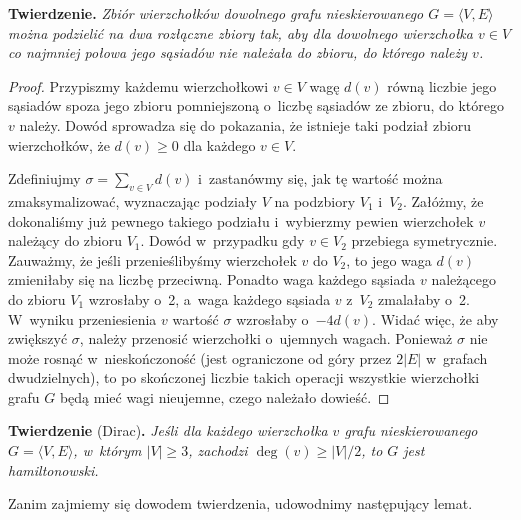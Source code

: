 \subproblem %
\textsf{\textbf{Twierdzenie.}} \textit{Zbiór wierzchołków dowolnego grafu nieskierowanego\/ $G=\langle V,E\rangle$ można podzielić na dwa rozłączne zbiory tak, aby dla dowolnego wierzchołka\/ $v\in V$ co najmniej połowa jego sąsiadów nie należała do zbioru, do którego należy\/ $v$.}
\begin{proof}
Przypiszmy każdemu wierzchołkowi $v\in V$ wagę $d(v)$ równą liczbie jego sąsiadów spoza jego zbioru pomniejszoną o~liczbę sąsiadów ze zbioru, do którego $v$ należy. Dowód sprowadza się do pokazania, że istnieje taki podział zbioru wierzchołków, że $d(v)\ge0$ dla każdego $v\in V$\!.

Zdefiniujmy $\sigma=\sum_{v\in V}d(v)$ i~zastanówmy się, jak tę wartość można zmaksymalizować, wyznaczając podziały $V$ na podzbiory $V_1$ i~$V_2$. Załóżmy, że dokonaliśmy już pewnego takiego podziału i~wybierzmy pewien wierzchołek $v$ należący do zbioru $V_1$. Dowód w~przypadku gdy $v\in V_2$ przebiega symetrycznie. Zauważmy, że jeśli przenieślibyśmy wierzchołek $v$ do $V_2$, to jego waga $d(v)$ zmieniłaby się na liczbę przeciwną. Ponadto waga każdego sąsiada $v$ należącego do zbioru $V_1$ wzrosłaby o~2, a~waga każdego sąsiada $v$ z~$V_2$ zmalałaby o~2. W~wyniku przeniesienia $v$ wartość $\sigma$ wzrosłaby o~$-4d(v)$. Widać więc, że aby zwiększyć $\sigma$, należy przenosić wierzchołki o~ujemnych wagach. Ponieważ $\sigma$ nie może rosnąć w~nieskończoność (jest ograniczone od góry przez $2|E|$ w~grafach dwudzielnych), to po skończonej liczbie takich operacji wszystkie wierzchołki grafu $G$ będą mieć wagi nieujemne, czego należało dowieść.
\end{proof}

\subproblem %
\textsf{\textbf{Twierdzenie} (Dirac)\textbf{.}} \textit{Jeśli dla każdego wierzchołka\/ $v$ grafu nieskierowanego\/ $G=\langle V,E\rangle$, w~którym\/ $|V|\ge3$, zachodzi\/ $\deg(v)\ge|V|/2$, to\/ $G$ jest hamiltonowski.}

\medskip
\noindent Zanim zajmiemy się dowodem twierdzenia, udowodnimy następujący lemat.


